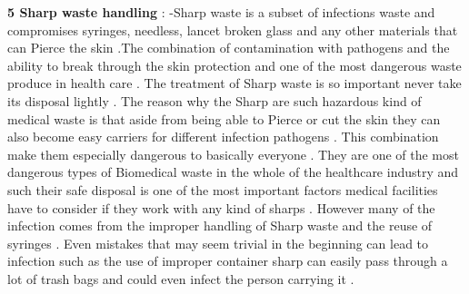 \documentclass[
]{article}
\begin{document}
\textbf{5 Sharp waste handling} : -Sharp waste is a subset of infections
waste and compromises syringes, needless, lancet broken glass and any
other materials that can Pierce the skin .The combination of
contamination with pathogens and the ability to break through the skin
protection and one of the most dangerous waste produce in health care .
The treatment of Sharp waste is so important never take its disposal
lightly . The reason why the Sharp are such hazardous kind of medical
waste is that aside from being able to Pierce or cut the skin they can
also become easy carriers for different infection pathogens . This
combination make them especially dangerous to basically everyone . They
are one of the most dangerous types of Biomedical waste in the whole of
the healthcare industry and such their safe disposal is one of the most
important factors medical facilities have to consider if they work with
any kind of sharps . However many of the infection comes from the
improper handling of Sharp waste and the reuse of syringes . Even
mistakes that may seem trivial in the beginning can lead to infection
such as the use of improper container sharp can easily pass through a
lot of trash bags and could even infect the person carrying it .
\end{document}
